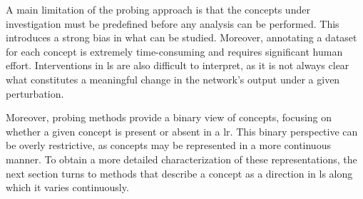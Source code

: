 A main limitation of the probing approach is that the concepts under investigation must be predefined before any analysis can be performed.
This introduces a strong bias in what can be studied.
Moreover, annotating a dataset for each concept is extremely time-consuming and requires significant human effort.
Interventions in \gls{ls} are also difficult to interpret, as it is not always clear what constitutes a meaningful change in the network's output under a given perturbation.

Moreover, probing methods provide a binary view of concepts, focusing on whether a given concept is present or absent in a \gls{lr}.
This binary perspective can be overly restrictive, as concepts may be represented in a more continuous manner.
To obtain a more detailed characterization of these representations, the next section turns to methods that describe a concept as a direction in \gls{ls} along which it varies continuously.